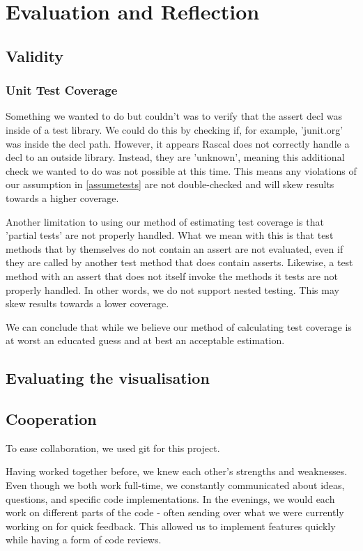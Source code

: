 \documentclass{article}
\begin{document}
\section{Evaluation and Reflection}

\subsection{Validity}

\subsubsection{Unit Test Coverage}
Something we wanted to do but couldn't was to verify that the assert decl was inside of a test library. We could do this by checking if, for example, 'junit.org' was inside the decl path. However, it appears Rascal does not correctly handle a decl to an outside library. Instead, they are 'unknown', meaning this additional check we wanted to do was not possible at this time. This means any violations of our assumption in \ref{assumetests} are not double-checked and will skew results towards a higher coverage.

Another limitation to using our method of estimating test coverage is that 'partial tests' are not properly handled. What we mean with this is that test methods that by themselves do not contain an assert are not evaluated, even if they are called by another test method that does contain asserts. Likewise, a test method with an assert that does not itself invoke the methods it tests are not properly handled.
In other words, we do not support nested testing. This may skew results towards a lower coverage.

We can conclude that while we believe our method of calculating test coverage is at worst an educated guess and at best an acceptable estimation.

\subsection{Evaluating the visualisation}

\subsection{Cooperation}
To ease collaboration, we used git for this project.

Having worked together before, we knew each other's strengths and weaknesses. Even though we both work full-time, we constantly communicated about ideas, questions, and specific code implementations. 
In the evenings, we would each work on different parts of the code - often sending over what we were currently working on for quick feedback. This allowed us to implement features quickly while having a form of code reviews.
\end{document}
